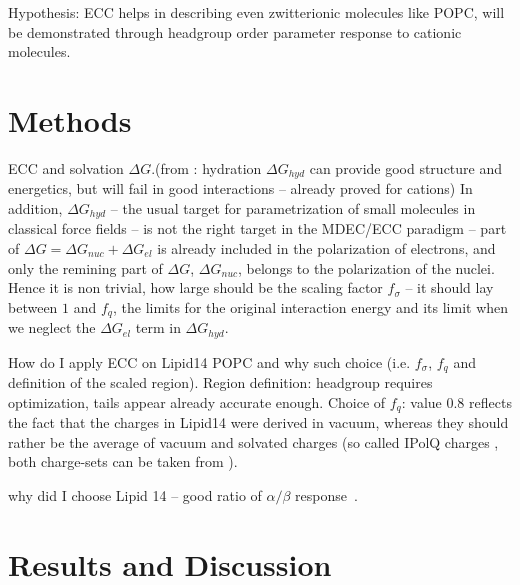 \documentclass[aip,jcp,twocolumn]{revtex4}
\begin{document}
Hypothesis: ECC helps in describing even zwitterionic molecules like POPC, will be demonstrated through headgroup order parameter response to cationic molecules.

\section{Methods}

ECC and solvation $\Delta G$.(from \cite{leontyev11} : hydration $\Delta  G_{hyd}$ can provide good structure and energetics, but will fail in good interactions -- already proved for cations)
In addition, $\Delta G_{hyd}$ -- the usual target for parametrization of small molecules in classical force fields -- is not the right target in the MDEC/ECC paradigm -- part of $\Delta G = \Delta G_{nuc} + \Delta G_{el}$ is already included in the polarization of electrons, and only the remining part of $\Delta G$,  $\Delta G_{nuc}$, belongs to the polarization of the nuclei. 
Hence it is non trivial, how large should be the scaling factor $f_\sigma$ -- it should lay between $1$ and $f_q$, the limits for the original interaction energy and its limit when we neglect the $\Delta G_{el}$ term in $\Delta G_{hyd}$. 

How do I apply ECC on Lipid14 POPC and why such choice (i.e. $f_\sigma$, $f_q$ and definition of the scaled region).
Region definition: headgroup requires optimization, tails appear already accurate enough. 
Choice of $f_q$: value 0.8 reflects the fact that the charges in Lipid14 were derived in vacuum, whereas they should rather be the average of vacuum and solvated charges (so called IPolQ charges \cite{Cerutti2013}, both charge-sets can be taken from \cite{maciejewski14}). 

why did I choose Lipid 14 -- good ratio of $\alpha / \beta$ response~\cite{catte16}.

\section{Results and Discussion}
\end{document}
